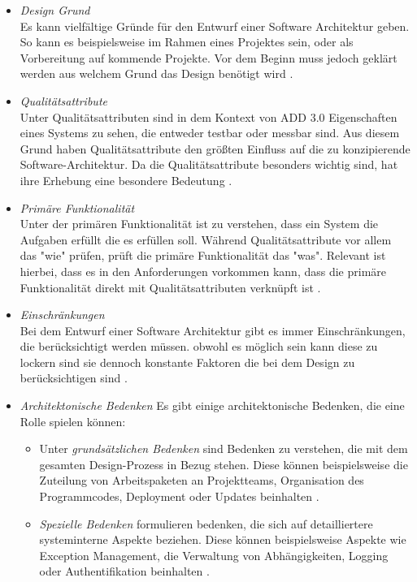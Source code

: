 \begin{itemize}
\item \emph{Design Grund} \\
Es kann vielf\"altige Gr\"unde f\"ur den Entwurf einer Software Architektur geben. So kann es beispielsweise im Rahmen eines Projektes sein, oder als Vorbereitung auf kommende Projekte. Vor dem Beginn muss jedoch gekl\"art werden aus welchem Grund das Design ben\"otigt wird \cite{Cer01}.
\item \emph{Qualit\"atsattribute} \\
Unter Qualit\"atsattributen sind in dem Kontext von ADD 3.0 Eigenschaften eines Systems zu sehen, die entweder testbar oder messbar sind. Aus diesem Grund haben Qualit\"atsattribute den gr\"o\ss{}ten Einfluss auf die zu konzipierende Software-Architektur. Da die Qualit\"atsattribute besonders wichtig sind, hat ihre Erhebung eine besondere Bedeutung \cite{Cer01}.
\item \emph{Prim\"are Funktionalit\"at} \\
Unter der prim\"aren Funktionalit\"at ist zu verstehen, dass ein System die Aufgaben erf\"ullt die es erf\"ullen soll. W\"ahrend Qualit\"atsattribute vor allem das "wie" pr\"ufen, pr\"uft die prim\"are Funktionalit\"at das "was". Relevant ist hierbei, dass es in den Anforderungen vorkommen kann, dass die prim\"are Funktionalit\"at direkt mit Qualit\"atsattributen verkn\"upft ist \cite{Cer01}. 
\item \emph{Einschr\"ankungen} \\
Bei dem Entwurf einer Software Architektur gibt es immer Einschr\"ankungen, die ber\"ucksichtigt werden m\"ussen. obwohl es m\"oglich sein kann diese zu lockern sind sie dennoch konstante Faktoren die bei dem Design zu ber\"ucksichtigen sind \cite{Cer01}.
\item \emph{Architektonische Bedenken} Es gibt einige architektonische Bedenken, die eine Rolle spielen k\"onnen:
\begin{itemize}
\item Unter \emph{grunds\"atzlichen Bedenken} sind Bedenken zu verstehen, die mit dem gesamten Design-Prozess in Bezug stehen. Diese k\"onnen beispielsweise die Zuteilung von Arbeitspaketen an Projektteams, Organisation des Programmcodes, Deployment oder Updates beinhalten \cite{Cer01}.
\item \emph{Spezielle Bedenken} formulieren bedenken, die sich auf detailliertere systeminterne Aspekte beziehen. Diese k\"onnen beispielsweise Aspekte wie Exception Management, die Verwaltung von Abh\"angigkeiten, Logging oder Authentifikation beinhalten \cite{Cer01}.

\end{itemize}
\end{itemize}
